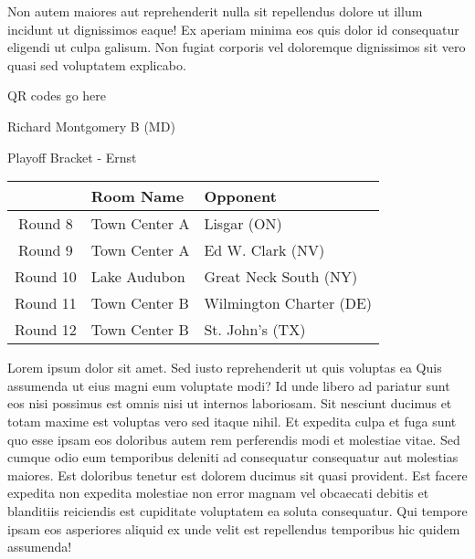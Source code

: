 \documentclass{article}%
\begin{document}
\newline%
Non autem maiores aut reprehenderit nulla sit repellendus dolore ut illum incidunt ut dignissimos eaque! Ex aperiam minima eos quis dolor id consequatur eligendi ut culpa galisum. Non fugiat corporis vel doloremque dignissimos sit vero quasi sed voluptatem explicabo.\newline%
\newline%
%
\vspace*{30pt}%
\begin{center}%
\begin{Huge}%
QR codes go here%
\end{Huge}%
\end{center}%
\newpage%
\begin{center}%
\begin{Huge}%
Richard Montgomery B (MD)%
\end{Huge}%
\vspace*{8pt}%
\linebreak%
\begin{Large}%
Playoff Bracket {-} Ernst%
\end{Large}%
\end{center}%
\begin{tabularx}{\textwidth}{|c|Y|Y|}%
\hline%
&Room Name&Opponent\\%
\hline%
Round 8&Town Center A&Lisgar (ON)\\%
Round 9&Town Center A&Ed W. Clark (NV)\\%
Round 10&Lake Audubon&Great Neck South (NY)\\%
Round 11&Town Center B&Wilmington Charter (DE)\\%
Round 12&Town Center B&St. John's (TX)\\%
\hline%
\end{tabularx}%
\vspace*{8pt}%
\linebreak%
\newline%
\newline%
Lorem ipsum dolor sit amet. Sed iusto reprehenderit ut quis voluptas ea Quis assumenda ut eius magni eum voluptate modi? Id unde libero ad pariatur sunt eos nisi possimus est omnis nisi ut internos laboriosam. Sit nesciunt ducimus et totam maxime est voluptas vero sed itaque nihil. Et expedita culpa et fuga sunt quo esse ipsam eos doloribus autem rem perferendis modi et molestiae vitae.\newline%
\newline%
Sed cumque odio eum temporibus deleniti ad consequatur consequatur aut molestias maiores. Est doloribus tenetur est dolorem ducimus sit quasi provident. Est facere expedita non expedita molestiae non error magnam vel obcaecati debitis et blanditiis reiciendis est cupiditate voluptatem ea soluta consequatur. Qui tempore ipsam eos asperiores aliquid ex unde velit est repellendus temporibus hic quidem assumenda!\newline%
\end{document}

